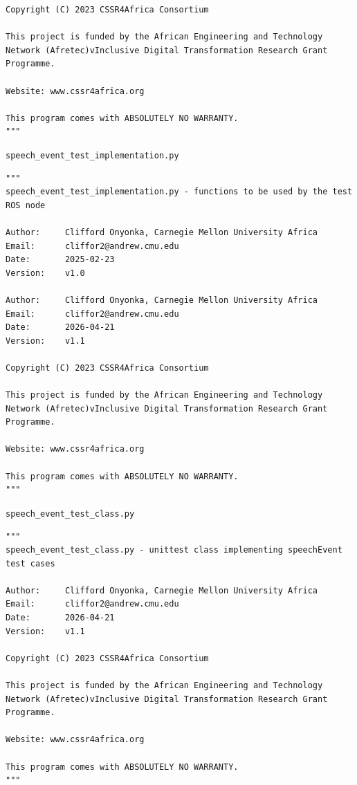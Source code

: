 \documentclass{CSSRforAfrica}
\newcommand{\checkboxChecked}{\fbox{\ding{51}}} %
\begin{document}
\begin{description}
{\begin{verbatim}
Copyright (C) 2023 CSSR4Africa Consortium

This project is funded by the African Engineering and Technology
Network (Afretec)vInclusive Digital Transformation Research Grant
Programme.

Website: www.cssr4africa.org

This program comes with ABSOLUTELY NO WARRANTY.
"""
\end{verbatim} }

\item[\checkboxChecked]  {\small \verb+speech_event_test_implementation.py+} 
{\small \begin{verbatim}
"""
speech_event_test_implementation.py - functions to be used by the test ROS node

Author:     Clifford Onyonka, Carnegie Mellon University Africa
Email:      cliffor2@andrew.cmu.edu
Date:       2025-02-23
Version:    v1.0

Author:     Clifford Onyonka, Carnegie Mellon University Africa
Email:      cliffor2@andrew.cmu.edu
Date:       2026-04-21
Version:    v1.1

Copyright (C) 2023 CSSR4Africa Consortium

This project is funded by the African Engineering and Technology
Network (Afretec)vInclusive Digital Transformation Research Grant
Programme.

Website: www.cssr4africa.org

This program comes with ABSOLUTELY NO WARRANTY.
"""
\end{verbatim} }

\item[\checkboxChecked]  {\small \verb+speech_event_test_class.py+} 
{\small \begin{verbatim}
"""
speech_event_test_class.py - unittest class implementing speechEvent test cases

Author:     Clifford Onyonka, Carnegie Mellon University Africa
Email:      cliffor2@andrew.cmu.edu
Date:       2026-04-21
Version:    v1.1

Copyright (C) 2023 CSSR4Africa Consortium

This project is funded by the African Engineering and Technology
Network (Afretec)vInclusive Digital Transformation Research Grant
Programme.

Website: www.cssr4africa.org

This program comes with ABSOLUTELY NO WARRANTY.
"""
\end{verbatim} }


\end{description}
\end{document}
